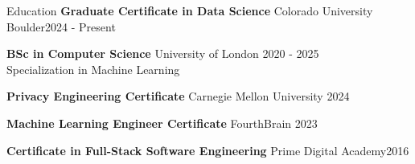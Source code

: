 \documentclass[
	12pt, %
]{resume} %
\begin{document}
\begin{rSection}{Education}
	\textbf{Graduate Certificate in Data Science} Colorado University Boulder\hfill{2024 - Present}

	\textbf{BSc in Computer Science} University of London \hfill{2020 - 2025} \\ 
	Specialization in Machine Learning \smallskip

	\textbf{Privacy Engineering Certificate} Carnegie Mellon University \hfill{2024}

	\textbf{Machine Learning Engineer Certificate} FourthBrain \hfill{2023}

	\textbf{Certificate in Full-Stack Software Engineering} Prime Digital Academy\hfill{2016}
\end{rSection}






\end{document}
